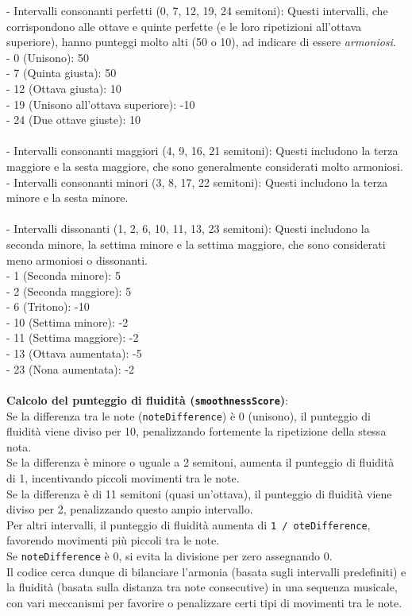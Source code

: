 \documentclass[a4paper,12pt]{report}
\begin{document}
- Intervalli consonanti perfetti (0, 7, 12, 19, 24 semitoni): Questi intervalli, che corrispondono alle ottave e quinte perfette (e le loro ripetizioni all'ottava superiore), hanno punteggi molto alti (50 o 10), ad indicare di essere \textit{armoniosi}. \\
    - 0 (Unisono): 50 \\
    - 7 (Quinta giusta): 50 \\
    - 12 (Ottava giusta): 10 \\
    - 19 (Unisono all'ottava superiore): -10 \\
    - 24 (Due ottave giuste): 10 \\
\\
- Intervalli consonanti maggiori (4, 9, 16, 21 semitoni): Questi includono la terza maggiore e la sesta maggiore, che sono generalmente considerati molto armoniosi. \\
- Intervalli consonanti minori (3, 8, 17, 22 semitoni): Questi includono la terza minore e la sesta minore. \\
\\
- Intervalli dissonanti (1, 2, 6, 10, 11, 13, 23 semitoni): Questi includono la seconda minore, la settima minore e la settima maggiore, che sono considerati meno armoniosi o dissonanti. \\
    - 1 (Seconda minore): 5 \\
    - 2 (Seconda maggiore): 5 \\
    - 6 (Tritono): -10 \\
    - 10 (Settima minore): -2 \\
    - 11 (Settima maggiore): -2 \\
    - 13 (Ottava aumentata): -5 \\
    - 23 (Nona aumentata): -2 \\
\\
\textbf{Calcolo del punteggio di fluidità (\texttt{smoothnessScore})}: \\
Se la differenza tra le note (\texttt{noteDifference}) è 0 (unisono), il punteggio di fluidità viene diviso per 10, penalizzando fortemente la ripetizione della stessa nota. \\
Se la differenza è minore o uguale a 2 semitoni, aumenta il punteggio di fluidità di 1, incentivando piccoli movimenti tra le note. \\
Se la differenza è di 11 semitoni (quasi un'ottava), il punteggio di fluidità viene diviso per 2, penalizzando questo ampio intervallo. \\
Per altri intervalli, il punteggio di fluidità aumenta di \texttt{1 / oteDifference}, favorendo movimenti più piccoli tra le note. \\
Se \texttt{noteDifference} è 0, si evita la divisione per zero assegnando 0. \\
Il codice cerca dunque di bilanciare l'armonia (basata sugli intervalli predefiniti) e la fluidità (basata sulla distanza tra note consecutive) in una sequenza musicale, con vari meccanismi per favorire o penalizzare certi tipi di movimenti tra le note. 
\end{document}
